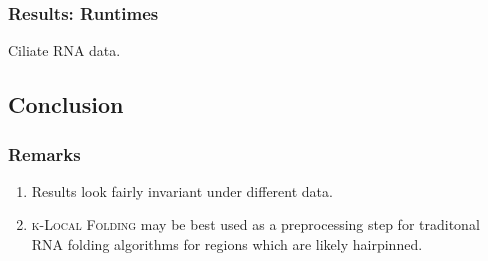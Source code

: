\documentclass{beamer}
\newcommand{\klf}{\textsc{k-Local Folding} }
\begin{document}
\begin{frame}
\frametitle{Results: Runtimes}
Ciliate RNA data.
\begin{figure}
\end{figure}
\end{frame}


\begin{frame}
\section{Conclusion}
\frametitle{Remarks}
\begin{enumerate}
\item Results look fairly invariant under different data. 
\item \klf may be best used as a preprocessing step for traditonal  RNA folding algorithms for regions which are likely hairpinned. 
\end{enumerate}
\end{frame}
\end{document}
